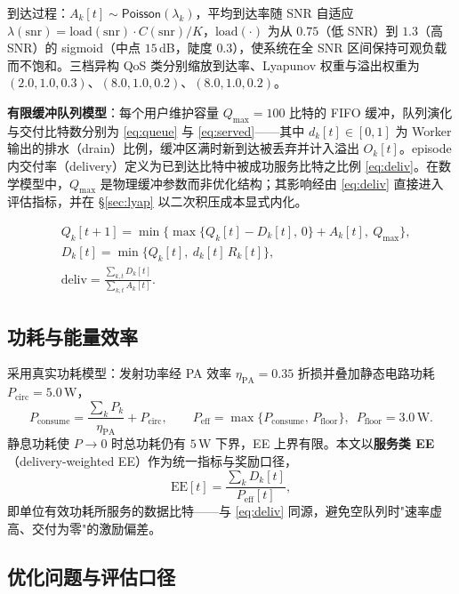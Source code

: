 \documentclass[UTF8,11pt,a4paper]{ctexart}
\theoremstyle{plain}
\theoremstyle{definition}
\theoremstyle{remark}
\begin{document}
到达过程：$A_k[t]\sim\mathsf{Poisson}(\lambda_k)$，平均到达率随 SNR 自适应 $\lambda(\mathrm{snr})=\mathrm{load}(\mathrm{snr})\cdot C(\mathrm{snr})/K$，$\mathrm{load}(\cdot)$ 为从 $0.75$（低 SNR）到 $1.3$（高 SNR）的 sigmoid（中点 $15$\,dB，陡度 $0.3$），使系统在全 SNR 区间保持可观负载而不饱和。三档异构 QoS 类分别缩放到达率、Lyapunov 权重与溢出权重为 $(2.0,1.0,0.3)$、$(8.0,1.0,0.2)$、$(8.0,1.0,0.2)$。

\textbf{有限缓冲队列模型}：每个用户维护容量 $Q_{\max}=100$ 比特的 FIFO 缓冲，队列演化与交付比特数分别为 \eqref{eq:queue} 与 \eqref{eq:served}——其中 $d_k[t]\in[0,1]$ 为 Worker 输出的排水（drain）比例，缓冲区满时新到达被丢弃并计入溢出 $O_k[t]$。episode 内交付率（delivery）定义为已到达比特中被成功服务比特之比例 \eqref{eq:deliv}。在数学模型中，$Q_{\max}$ 是物理缓冲参数而非优化结构；其影响经由 \eqref{eq:deliv} 直接进入评估指标，并在 \S\ref{sec:lyap} 以二次积压成本显式内化。

\begin{align}
  &Q_k[t+1] = \min\{\max\{Q_k[t]-D_k[t],\,0\}+A_k[t],\ Q_{\max}\}, \label{eq:queue}\\
  &D_k[t] = \min\{Q_k[t],\ d_k[t]\,R_k[t]\}, \label{eq:served}\\
  &\mathrm{deliv} = \frac{\sum_{k,t}D_k[t]}{\sum_{k,t}A_k[t]}. \label{eq:deliv}
\end{align}

\subsection{功耗与能量效率}

采用真实功耗模型：发射功率经 PA 效率 $\eta_{\mathrm{PA}}=0.35$ 折损并叠加静态电路功耗 $P_{\mathrm{circ}}=5.0\,\mathrm{W}$，
\begin{equation}
  P_{\mathrm{consume}} = \frac{\sum_k P_k}{\eta_{\mathrm{PA}}} + P_{\mathrm{circ}},
  \qquad P_{\mathrm{eff}} = \max\{P_{\mathrm{consume}},\,P_{\mathrm{floor}}\},\enspace P_{\mathrm{floor}}=3.0\,\mathrm{W}.
  \label{eq:power}
\end{equation}
静息功耗使 $P\to0$ 时总功耗仍有 $5$\,W 下界，EE 上界有限。本文以\textbf{服务类 EE}（delivery-weighted EE）作为统一指标与奖励口径，
\begin{equation}
  \mathrm{EE}[t] = \frac{\sum_k D_k[t]}{P_{\mathrm{eff}}[t]},
  \label{eq:ee}
\end{equation}
即单位有效功耗所服务的数据比特——与 \eqref{eq:deliv} 同源，避免空队列时"速率虚高、交付为零"的激励偏差。

\subsection{优化问题与评估口径} \label{sec:prob}
\end{document}
